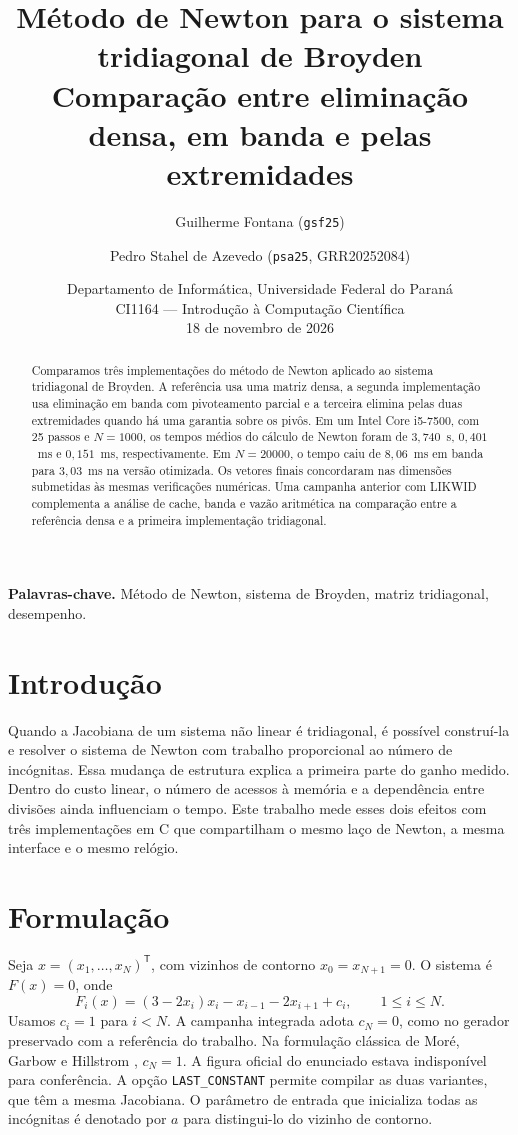 \documentclass[11pt,a4paper]{article}
\title{\textbf{Método de Newton para o sistema tridiagonal de Broyden}\\[0.25em]
       \large Comparação entre eliminação densa, em banda e pelas extremidades}
\author{Guilherme Fontana (\texttt{gsf25}) \and Pedro Stahel de Azevedo (\texttt{psa25}, GRR20252084)}
\date{Departamento de Informática, Universidade Federal do Paraná\\
      CI1164 — Introdução à Computação Científica\\
      18 de novembro de 2026}
\begin{document}
\maketitle

\begin{abstract}
Comparamos três implementações do método de Newton aplicado ao sistema
tridiagonal de Broyden. A referência usa uma matriz densa, a segunda
implementação usa eliminação em banda com pivoteamento parcial e a
terceira elimina pelas duas extremidades quando há uma garantia sobre
os pivôs. Em um Intel Core i5-7500, com 25 passos e $N=1000$, os tempos
médios do cálculo de Newton foram de $3{,}740$~s, $0{,}401$~ms e
$0{,}151$~ms, respectivamente. Em $N=20000$, o tempo caiu de
$8{,}06$~ms em banda para $3{,}03$~ms na versão otimizada. Os vetores
finais concordaram nas dimensões submetidas às mesmas verificações
numéricas. Uma campanha anterior com LIKWID complementa a análise de
cache, banda e vazão aritmética na comparação entre a referência densa
e a primeira implementação tridiagonal.
\end{abstract}

\noindent\textbf{Palavras-chave.} Método de Newton, sistema de Broyden,
matriz tridiagonal, desempenho.

\section{Introdução}

Quando a Jacobiana de um sistema não linear é tridiagonal, é possível
construí-la e resolver o sistema de Newton com trabalho proporcional ao
número de incógnitas. Essa mudança de estrutura explica a primeira parte
do ganho medido. Dentro do custo linear, o número de acessos à memória e
a dependência entre divisões ainda influenciam o tempo. Este trabalho
mede esses dois efeitos com três implementações em C que compartilham
o mesmo laço de Newton, a mesma interface e o mesmo relógio.

\section{Formulação}

Seja $x=(x_1,\ldots,x_N)^\mathsf{T}$, com vizinhos de contorno
$x_0=x_{N+1}=0$. O sistema é $F(x)=0$, onde
\begin{equation}
  F_i(x)=(3-2x_i)x_i-x_{i-1}-2x_{i+1}+c_i,\qquad 1\leq i\leq N.
  \label{eq:broyden}
\end{equation}
Usamos $c_i=1$ para $i<N$. A campanha integrada adota $c_N=0$, como no
gerador preservado com a referência do trabalho. Na formulação clássica
de Moré, Garbow e Hillstrom \cite{more}, $c_N=1$. A figura oficial do
enunciado estava indisponível para conferência. A opção
\texttt{LAST\_CONSTANT} permite compilar as duas variantes, que têm
a mesma Jacobiana. O parâmetro de entrada que inicializa todas as
incógnitas é denotado por $a$ para distingui-lo do vizinho de contorno.
\end{document}
